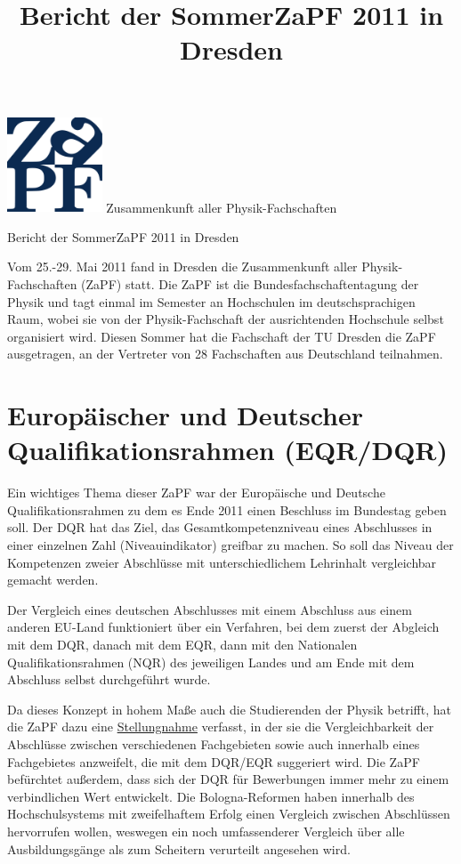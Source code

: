 \documentclass{scrartcl}
\title{Bericht der SommerZaPF 2011 in Dresden}
\author{}
\date{}
\begin{document}
\hspace{0.87\textwidth}
\begin{minipage}{120pt}
\vspace{-1.8cm}
\includegraphics[width=80pt]{logo.pdf}
\centering
\small Zusammenkunft aller Physik-Fachschaften
\end{minipage}

\begin{center}
\vspace{1.5cm}
\huge{Bericht der SommerZaPF 2011 in Dresden} 
\vspace{1cm}
\end{center}

Vom 25.-29. Mai 2011 fand in Dresden die Zusammenkunft aller Physik-Fachschaften (ZaPF) statt. Die ZaPF ist die
Bundesfachschaftentagung der Physik und tagt einmal im Semester an Hochschulen im deutschsprachigen Raum, wobei sie von
der Physik-Fachschaft der ausrichtenden Hochschule selbst organisiert wird. Diesen Sommer hat die Fachschaft der TU
Dresden die ZaPF ausgetragen, an der Vertreter von 28 Fachschaften aus Deutschland teilnahmen.


\section*{Europäischer und Deutscher Qualifikationsrahmen (EQR/DQR)}
Ein wichtiges Thema dieser ZaPF war der Europäische und Deutsche Qualifikationsrahmen zu dem es Ende 2011 einen
Beschluss im Bundestag geben soll. Der DQR hat das Ziel, das Gesamtkompetenzniveau eines Abschlusses in einer
einzelnen Zahl (Niveauindikator) greifbar zu machen. So soll das Niveau der Kompetenzen zweier Abschlüsse
mit unterschiedlichem Lehrinhalt vergleichbar gemacht werden.

Der Vergleich eines deutschen Abschlusses mit einem
Abschluss aus einem anderen EU-Land funktioniert über ein Verfahren, bei dem zuerst der Abgleich mit dem DQR, danach
mit dem EQR, dann mit den Nationalen Qualifikationsrahmen (NQR) des jeweiligen Landes und am Ende mit dem Abschluss 
selbst durchgeführt wurde.

Da dieses Konzept in hohem Maße auch die Studierenden der Physik betrifft, hat die ZaPF dazu eine
\href{http://www.zapfev.de/resolutionen/sose11/Reso_EQR-DQR.pdf}{Stellungnahme} verfasst, in der sie die
Vergleichbarkeit der Abschlüsse
zwischen verschiedenen Fachgebieten sowie auch innerhalb eines Fachgebietes anzweifelt, die mit dem DQR/EQR suggeriert
wird. Die ZaPF befürchtet außerdem, dass sich der DQR für Bewerbungen immer mehr zu einem verbindlichen Wert entwickelt.
Die Bologna-Reformen haben innerhalb des Hochschulsystems mit zweifelhaftem Erfolg einen Vergleich zwischen Abschlüssen
hervorrufen wollen, weswegen ein noch umfassenderer Vergleich über alle Ausbildungsgänge als zum Scheitern verurteilt
angesehen wird. 
\end{document}
